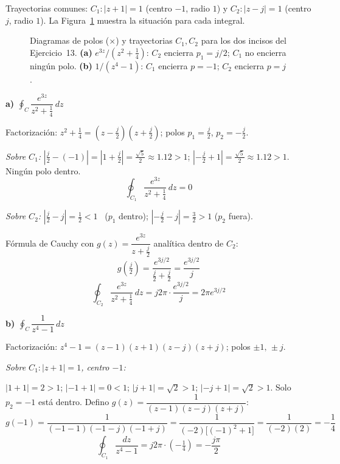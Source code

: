 \documentclass[10pt,a4paper]{article}
\begin{document}
\noindent Trayectorias comunes: $C_1:|z+1|=1$ (centro $-1$, radio $1$) y $C_2:|z-j|=1$ (centro $j$, radio $1$). La Figura~\ref{fig:pz_ej13} muestra la situación para cada integral.

\begin{figure}[H]
	\centering
	
	\caption{Diagramas de polos ($\times$) y trayectorias $C_1,C_2$ para los dos incisos del Ejercicio~13. \textbf{(a)} $e^{3z}/(z^2+\tfrac{1}{4})$: $C_2$ encierra $p_1=j/2$; $C_1$ no encierra ningún polo. \textbf{(b)} $1/(z^4-1)$: $C_1$ encierra $p=-1$; $C_2$ encierra $p=j$.}
	\label{fig:pz_ej13}
\end{figure}

\bigskip

\noindent\textbf{a) $\displaystyle\oint_C \dfrac{e^{3z}}{z^2+\tfrac{1}{4}}\,dz$}

Factorización: $z^2+\tfrac{1}{4}=(z-\tfrac{j}{2})(z+\tfrac{j}{2})$; polos $p_1=\tfrac{j}{2}$, $p_2=-\tfrac{j}{2}$.

\smallskip
\noindent\textit{Sobre $C_1$:}
$\left|\tfrac{j}{2}-(-1)\right|=\left|1+\tfrac{j}{2}\right|=\tfrac{\sqrt{5}}{2}\approx1.12>1$;\quad
$\left|-\tfrac{j}{2}+1\right|=\tfrac{\sqrt{5}}{2}\approx1.12>1$. Ningún polo dentro.
\[
	\oint_{C_1} \frac{e^{3z}}{z^2+\frac{1}{4}}\,dz = 0
\]

\smallskip
\noindent\textit{Sobre $C_2$:}
$\left|\tfrac{j}{2}-j\right|=\tfrac{1}{2}<1$ \checkmark\ ($p_1$ dentro);\quad
$\left|-\tfrac{j}{2}-j\right|=\tfrac{3}{2}>1$ ($p_2$ fuera).

Fórmula de Cauchy con $g(z)=\dfrac{e^{3z}}{z+\frac{j}{2}}$ analítica dentro de $C_2$:
\[
	g\!\left(\tfrac{j}{2}\right) = \frac{e^{3j/2}}{\tfrac{j}{2}+\tfrac{j}{2}} = \frac{e^{3j/2}}{j}
\]
\[
	\boxed{\oint_{C_2} \frac{e^{3z}}{z^2+\frac{1}{4}}\,dz = j2\pi \cdot \frac{e^{3j/2}}{j} = 2\pi e^{3j/2}}
\]

\bigskip

\noindent\textbf{b) $\displaystyle\oint_C \dfrac{1}{z^4-1}\,dz$}

Factorización: $z^4-1=(z-1)(z+1)(z-j)(z+j)$; polos $\pm1,\,\pm j$.

\smallskip
\noindent\textit{Sobre $C_1: |z+1|=1$, centro $-1$:}

$|1+1|=2>1$;\; $|{-1+1}|=0<1$\checkmark;\; $|j+1|=\sqrt{2}>1$;\; $|{-j+1}|=\sqrt{2}>1$.
Solo $p_2=-1$ está dentro. Defino $g(z)=\dfrac{1}{(z-1)(z-j)(z+j)}$:
\[
	g(-1) = \frac{1}{(-1-1)(-1-j)(-1+j)} = \frac{1}{(-2)\bigl[(-1)^2+1\bigr]}
	= \frac{1}{(-2)(2)} = -\frac{1}{4}
\]
\[
	\boxed{\oint_{C_1} \frac{dz}{z^4-1} = j2\pi\cdot\!\left(-\tfrac{1}{4}\right) = -\frac{j\pi}{2}}
\]
\end{document}
